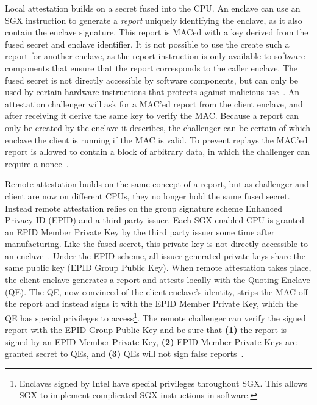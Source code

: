 \documentclass{article}
\begin{document}
			Local attestation builds on a secret fused into the CPU.
			An enclave can use an SGX instruction to generate a \textit{report} uniquely identifying the enclave, as it also contain the enclave signature.
			This report is MACed with a key derived from the fused secret and enclave identifier.
			It is not possible to use the create such a report for another enclave, as the report instruction is only available to software components that ensure that the report corresponds to the caller enclave.
			The fused secret is not directly accessible by software components, but can only be used by certain hardware instructions that protects against malicious use~\cite{costan_intel_2016}.
			An attestation challenger will ask for a MAC'ed report from the client enclave, and after receiving it derive the same key to verify the MAC.
			Because a report can only be created by the enclave it describes, the challenger can be certain of which enclave the client is running if the MAC is valid.
			To prevent replays the MAC'ed report is allowed to contain a block of arbitrary data, in which the challenger can require a nonce~\cite{costan_intel_2016}.

			Remote attestation builds on the same concept of a report, but as challenger and client are now on different CPUs, they no longer hold the same fused secret.
			Instead remote attestation relies on the group signature scheme Enhanced Privacy ID (EPID) and a third party issuer.
			Each SGX enabled CPU is granted an EPID Member Private Key by the third party issuer some time after manufacturing.
			Like the fused secret, this private key is not directly accessible to an enclave~\cite{costan_intel_2016}.
			Under the EPID scheme, all issuer generated private keys share the same public key (EPID Group Public Key).
			When remote attestation takes place, the client enclave generates a report and attests locally with the Quoting Enclave (QE).
			The QE, now convinced of the client enclave's identity, strips the MAC off the report and instead signs it with the EPID Member Private Key, which the QE has special privileges to access\footnote{Enclaves signed by Intel have special privileges throughout SGX. This allows SGX to implement complicated SGX instructions in software.}.
			The remote challenger can verify the signed report with the EPID Group Public Key and be sure that \textbf{(1)} the report is signed by an EPID Member Private Key, \textbf{(2)} EPID Member Private Keys are granted secret to QEs, and \textbf{(3)} QEs will not sign false reports~\cite{costan_intel_2016}.
\end{document}
